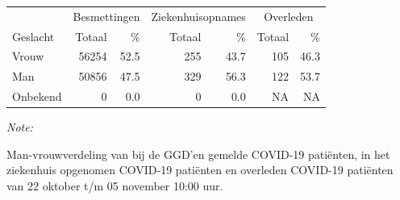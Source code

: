 \documentclass[
  english,
  man,floatsintext]{apa6}
\begin{document}
\begin{table}
\centering\begingroup\fontsize{11}{13}\selectfont

\begin{threeparttable}
\begin{tabular}{lrrrrrr}
\toprule
\multicolumn{1}{c}{ } & \multicolumn{2}{c}{Besmettingen} & \multicolumn{2}{c}{Ziekenhuisopnames} & \multicolumn{2}{c}{Overleden} \\
\cmidrule(l{3pt}r{3pt}){2-3} \cmidrule(l{3pt}r{3pt}){4-5} \cmidrule(l{3pt}r{3pt}){6-7}
Geslacht & Totaal & \% & Totaal & \% & Totaal & \%\\
\midrule
Vrouw & 56254 & 52.5 & 255 & 43.7 & 105 & 46.3\\
Man & 50856 & 47.5 & 329 & 56.3 & 122 & 53.7\\
Onbekend & 0 & 0.0 & 0 & 0.0 & NA & NA\\
\bottomrule
\end{tabular}
\begin{tablenotes}
\item \textit{Note: } 
\item Man-vrouwverdeling van bij de GGD’en gemelde COVID-19 patiënten, in het ziekenhuis opgenomen COVID-19 patiënten en overleden COVID-19 patiënten van 22 oktober t/m 05 november 10:00 uur.
\end{tablenotes}
\end{threeparttable}
\endgroup{}
\end{table}
\newpage
\end{document}
